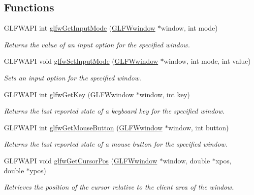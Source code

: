 \subsection*{Functions}
\begin{DoxyCompactItemize}
\item 
G\+L\+F\+W\+A\+P\+I int \hyperlink{group__input_ga1248dd5b1e566b2817e71547564d6af9}{glfw\+Get\+Input\+Mode} (\hyperlink{group__window_ga3c96d80d363e67d13a41b5d1821f3242}{G\+L\+F\+Wwindow} $\ast$window, int mode)
\begin{DoxyCompactList}\small\item\em Returns the value of an input option for the specified window. \end{DoxyCompactList}\item 
G\+L\+F\+W\+A\+P\+I void \hyperlink{group__input_gae1eb729d2dd91dc33fd60e150a6e1684}{glfw\+Set\+Input\+Mode} (\hyperlink{group__window_ga3c96d80d363e67d13a41b5d1821f3242}{G\+L\+F\+Wwindow} $\ast$window, int mode, int value)
\begin{DoxyCompactList}\small\item\em Sets an input option for the specified window. \end{DoxyCompactList}\item 
G\+L\+F\+W\+A\+P\+I int \hyperlink{group__input_ga7d8ad8ffaf272808f04e1d5d33ec8859}{glfw\+Get\+Key} (\hyperlink{group__window_ga3c96d80d363e67d13a41b5d1821f3242}{G\+L\+F\+Wwindow} $\ast$window, int key)
\begin{DoxyCompactList}\small\item\em Returns the last reported state of a keyboard key for the specified window. \end{DoxyCompactList}\item 
G\+L\+F\+W\+A\+P\+I int \hyperlink{group__input_ga6da5efb04f700c312a57a169fa9393a0}{glfw\+Get\+Mouse\+Button} (\hyperlink{group__window_ga3c96d80d363e67d13a41b5d1821f3242}{G\+L\+F\+Wwindow} $\ast$window, int button)
\begin{DoxyCompactList}\small\item\em Returns the last reported state of a mouse button for the specified window. \end{DoxyCompactList}\item 
G\+L\+F\+W\+A\+P\+I void \hyperlink{group__input_gad289438eb7cf53d11eca685373f44105}{glfw\+Get\+Cursor\+Pos} (\hyperlink{group__window_ga3c96d80d363e67d13a41b5d1821f3242}{G\+L\+F\+Wwindow} $\ast$window, double $\ast$xpos, double $\ast$ypos)
\begin{DoxyCompactList}\small\item\em Retrieves the position of the cursor relative to the client area of the window. \end{DoxyCompactList}\item 

\end{DoxyCompactItemize}
